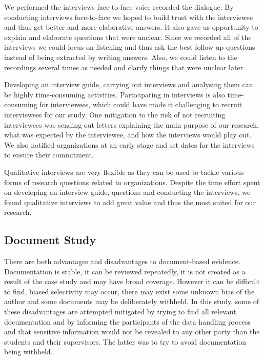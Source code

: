 We performed the interviews face-to-face voice recorded the dialogue. By conducting interviews face-to-face we hoped to build trust with the interviewee and thus get better and more elaborative answers. It also gave us opportunity to explain and elaborate questions that were unclear. Since we recorded all of the interviews we could focus on listening and thus ask the best follow-up questions instead of being extracted by writing answers. Also, we could listen to the recordings several times as needed and clarify things that were unclear later.

Developing an interview guide, carrying out interviews and analysing them can be highly time-consuming activities. Participating in interviews is also time-consuming for interviewees, which could have made it challenging to recruit interviewees for our study. One mitigation to the risk of not recruiting interviewees was sending out letters explaining the main purpose of our research, what was expected by the interviewee, and how the interviews would play out. We also notified organizations at an early stage and set dates for the interviews to ensure their commitment.

Qualitative interviews are very flexible as they can be used to tackle various forms of research questions related to organizations. Despite the time effort spent on developing an interview guide, questions and conducting the interviews, we found qualitative interviews to add great value and thus the most suited for our research.

\subsection{Document Study}
\label{sec:documentStudy}
There are both advantages and disadvantages to document-based evidence. Documentation is stable, it can be reviewed repeatedly, it is not created as a result of the case study and may have broad coverage. However it can be difficult to find, biased selectivity may occur, there may exist some unknown bias of the author and some documents may be deliberately withheld. In this study, some of these disadvantages are attempted mitigated by trying to find all relevant documentation and by informing the participants of the data handling process and that sensitive information would not be revealed to any other party than the students and their supervisors. The latter was to try to avoid documentation being withheld.  


